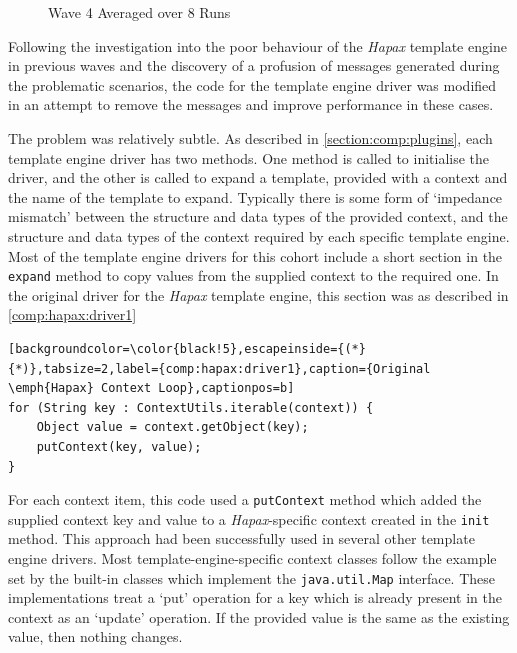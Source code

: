 \begin{figure}[ht!]
\centering

\caption{\label{multi:wave4-average}Wave 4 Averaged over 8 Runs}
\end{figure}

Following the investigation into the poor behaviour of the \emph{Hapax} template engine in previous waves and the discovery of a profusion of messages generated during the problematic scenarios, the code for the template engine driver was modified in an attempt to remove the messages and improve performance in these cases.

The problem was relatively subtle. As described in \autoref{section:comp:plugins}, each template engine driver has two methods. One method is called to initialise the driver, and the other is called to expand a template, provided with a context and the name of the template to expand. Typically there is some form of `impedance mismatch' between the structure and data types of the provided context, and the structure and data types of the context required by each specific template engine. Most of the template engine drivers for this cohort include a short section in the \verb!expand! method to copy values from the supplied context to the required one. In the original driver for the \emph{Hapax} template engine, this section was as described in \autoref{comp:hapax:driver1}

\begin{lstlisting}[backgroundcolor=\color{black!5},escapeinside={(*}{*)},tabsize=2,label={comp:hapax:driver1},caption={Original \emph{Hapax} Context Loop},captionpos=b]
for (String key : ContextUtils.iterable(context)) {
    Object value = context.getObject(key);
    putContext(key, value);
}
\end{lstlisting}

For each context item, this code used a \verb!putContext! method which added the supplied context key and value to a \emph{Hapax}-specific context created in the \verb!init! method. This approach had been successfully used in several other template engine drivers. Most template-engine-specific context classes follow the example set by the built-in classes which implement the \verb!java.util.Map! interface. These implementations treat a `put' operation for a key which is already present in the context as an `update' operation. If the provided value is the same as the existing value, then nothing changes.

